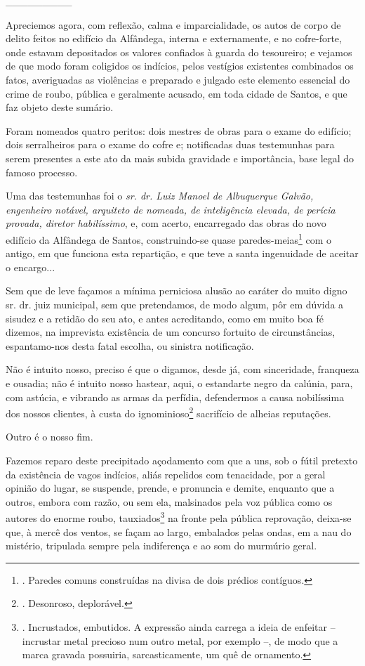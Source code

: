 \_\_\_\_\_\_\_\_\_

Apreciemos agora, com reflexão, calma e imparcialidade, os autos de
corpo de delito feitos no edifício da Alfândega, interna e externamente,
e no cofre-forte, onde estavam depositados os valores confiados à guarda
do tesoureiro; e vejamos de que modo foram coligidos os indícios, pelos
vestígios existentes combinados os fatos, averiguadas as violências e
preparado e julgado este elemento essencial do crime de roubo, pública e
geralmente acusado, em toda cidade de Santos, e que faz objeto deste
sumário.

Foram nomeados quatro peritos: dois mestres de obras para o exame do
edifício; dois serralheiros para o exame do cofre e; notificadas duas
testemunhas para serem presentes a este ato da mais subida gravidade e
importância, base legal do famoso processo.

Uma das testemunhas foi o \emph{sr. dr. Luiz Manoel de Albuquerque
Galvão, engenheiro notável, arquiteto de nomeada, de inteligência
elevada, de perícia provada, diretor habilíssimo}, e, com acerto,
encarregado das obras do novo edifício da Alfândega de Santos,
construindo-se quase paredes-meias\footnote{. Paredes comuns construídas
  na divisa de dois prédios contíguos.} com o antigo, em que funciona
esta repartição, e que teve a santa ingenuidade de aceitar o encargo...

Sem que de leve façamos a mínima perniciosa alusão ao caráter do muito
digno sr. dr. juiz municipal, sem que pretendamos, de modo algum, pôr em
dúvida a sisudez e a retidão do seu ato, e antes acreditando, como em
muito boa fé dizemos, na imprevista existência de um concurso fortuito
de circunstâncias, espantamo-nos desta fatal escolha, ou sinistra
notificação.

Não é intuito nosso, preciso é que o digamos, desde já, com sinceridade,
franqueza e ousadia; não é intuito nosso hastear, aqui, o estandarte
negro da calúnia, para, com astúcia, e vibrando as armas da perfídia,
defendermos a causa nobilíssima dos nossos clientes, à custa do
ignominioso\footnote{. Desonroso, deplorável.} sacrifício de alheias
reputações.

Outro é o nosso fim.

Fazemos reparo deste precipitado açodamento com que a uns, sob o fútil
pretexto da existência de vagos indícios, aliás repelidos com
tenacidade, por a geral opinião do lugar, se suspende, prende, e
pronuncia e demite, enquanto que a outros, embora com razão, ou sem ela,
malsinados pela voz pública como os autores do enorme roubo,
tauxiados\footnote{. Incrustados, embutidos. A expressão ainda carrega a
  ideia de enfeitar -- incrustar metal precioso num outro metal, por
  exemplo --, de modo que a marca gravada possuiria, sarcasticamente, um
  quê de ornamento.} na fronte pela pública reprovação, deixa-se que, à
mercê dos ventos, se façam ao largo, embalados pelas ondas, em a nau do
mistério, tripulada sempre pela indiferença e ao som do murmúrio geral.

